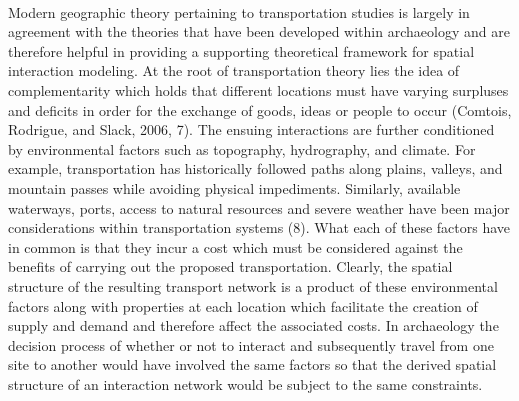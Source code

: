 \documentclass[12pt,a4paper]{thesis}
\begin{document}
\paragraph{}
Modern geographic theory pertaining to transportation studies is largely in agreement with the theories that have been developed within archaeology and are therefore helpful in providing a supporting theoretical framework for spatial interaction modeling. At the root of transportation theory lies the idea of complementarity which holds that different locations must have varying surpluses and deficits in order for the exchange of goods, ideas or people to occur (Comtois, Rodrigue, and Slack, 2006, 7). The ensuing interactions are further conditioned by environmental factors such as topography, hydrography, and climate. For example, transportation has historically followed paths along plains, valleys, and mountain passes while avoiding physical impediments. Similarly, available waterways, ports, access to natural resources and severe weather have been major considerations within transportation systems (8). What each of these factors have in common is that they incur a cost which must be considered against the benefits of carrying out the proposed transportation. Clearly, the spatial structure of the resulting transport network is a product of these environmental factors along with properties at each location which facilitate the creation of supply and demand and therefore affect the associated costs. In archaeology the decision process of whether or not to interact and subsequently travel from one site to another would have involved the same factors so that the derived spatial structure of an interaction network would be subject to the same constraints.    

\paragraph{}
	
\end{document}
